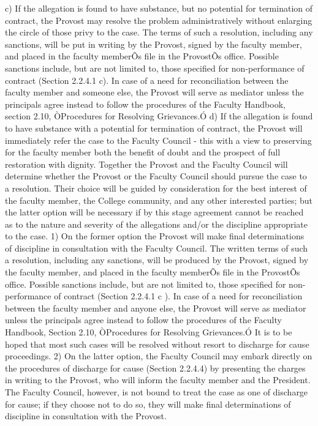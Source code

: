 \documentclass[letterpaper, 11pt]{article}
\begin{document}
	c) If the allegation is found to have substance, but no potential for termination of contract, the Provost may resolve the problem administratively without enlarging the circle of those privy to the case.  The terms of such a resolution, including any sanctions, will be put in writing by the Provost, signed by the faculty member, and placed in the faculty memberÕs file in the ProvostÕs office.  Possible sanctions include, but are not limited to, those specified for non-performance of contract (Section 2.2.4.1 c).  In case of a need for reconciliation between the faculty member and someone else, the Provost will serve as mediator unless the principals agree instead to follow the procedures of the Faculty Handbook, section 2.10, ÒProcedures for Resolving Grievances.Ó
	d) If the allegation is found to have substance with a potential for termination of contract, the Provost will immediately refer the case to the Faculty Council - this with a view to preserving for the faculty member both the benefit of doubt and the prospect of full restoration with dignity.  Together the Provost and the Faculty Council will determine whether the Provost or the Faculty Council should pursue the case to a resolution.  Their choice will be guided by consideration for the best interest of the faculty member, the College community, and any other interested parties; but the latter option will be necessary if by this stage agreement cannot be reached as to the nature and severity of the allegations and/or the discipline appropriate to the case.
	1) On the former option the Provost will make final determinations of discipline in consultation with the Faculty Council.  The written terms of such a resolution, including any sanctions, will be produced by the Provost, signed by the faculty member, and placed in the faculty memberÕs file in the ProvostÕs office.  Possible sanctions include, but are not limited to, those specified for non-performance of contract (Section 2.2.4.1 c ).  In case of a need for reconciliation between the faculty member and anyone else, the Provost will serve as mediator unless the principals agree instead to follow the procedures of the Faculty Handbook, Section 2.10, ÒProcedures for Resolving Grievances.Ó  It is to be hoped that most such cases will be resolved without resort to discharge for cause proceedings.
	2) On the latter option, the Faculty Council may embark directly on the procedures of discharge for cause (Section 2.2.4.4) by presenting the charges in writing to the Provost, who will inform the faculty member and the President.  The Faculty Council, however, is not bound to treat the case as one of discharge for cause; if they choose not to do so, they will make final determinations of discipline in consultation with the Provost.
\end{document}
